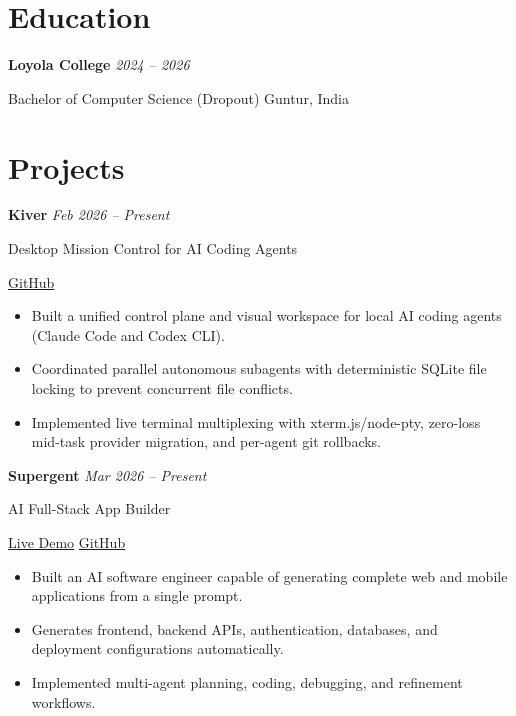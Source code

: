 \documentclass[11pt,letterpaper]{article}
\begin{document}

\section{Education}

\textbf{Loyola College}
\hfill
\textit{2024 -- 2026}

Bachelor of Computer Science (Dropout) \hfill Guntur, India


\section{Projects}

\textbf{Kiver}
\hfill
\textit{Feb 2026 -- Present}

Desktop Mission Control for AI Coding Agents

{\small
\href{https://github.com/manideep1428/Kiver}{GitHub}
}

\begin{itemize}
    \item Built a unified control plane and visual workspace for local AI coding agents (Claude Code and Codex CLI).
    \item Coordinated parallel autonomous subagents with deterministic SQLite file locking to prevent concurrent file conflicts.
    \item Implemented live terminal multiplexing with xterm.js/node-pty, zero-loss mid-task provider migration, and per-agent git rollbacks.
\end{itemize}

\vspace{5pt}

\textbf{Supergent}
\hfill
\textit{Mar 2026 -- Present}

AI Full-Stack App Builder

{\small
\href{https://supergent-web.vercel.app/}{Live Demo}
\quad\textbar\quad
\href{https://github.com/manideep1428/supergent}{GitHub}
}

\begin{itemize}
    \item Built an AI software engineer capable of generating complete web and mobile applications from a single prompt.
    \item Generates frontend, backend APIs, authentication, databases, and deployment configurations automatically.
    \item Implemented multi-agent planning, coding, debugging, and refinement workflows.
\end{itemize}
\end{document}
